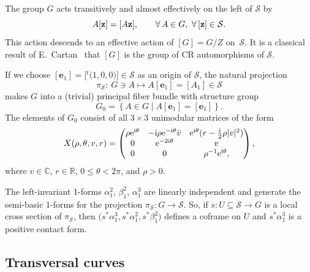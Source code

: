 \documentclass[pdftex]{sigma}
\numberwithin{equation}{section}
\def\C{\mathbb{C}}
\def\R{\mathbb{R}}
\def\S{\mathcal{S}}
\def\S{\mathcal{S}}
\begin{document}
The group $G$ acts transitively and almost effectively on the left of
$\S$ by
\begin{equation*}
 A[{\bf z}] = [A {\bf z}], \qquad \forall \, A\in {G}, \  \forall \, [{\bf z}] \in\S.
 \end{equation*}
This action descends to an effective action of $[{G}]={ G}/{Z}$ on~$\S$.
It is a classical result of E.~Cartan~\cite{Cartan1932-2,Cartan1932,ChMo1974} that $[{G}]$
is the group of CR automorphisms
of $\S$.

If we choose $[\mathbf{e}_1]=\big[ {^t\!(}1,0,0)\big]\in \mathcal{S}$ as an origin of $\mathcal{S}$,
the natural projection
\begin{equation*}
 \pi_\S\colon \ {G}\ni A \mapsto A[\mathbf{e}_1] =[A_1]\in\S
 \end{equation*}
makes ${G}$ into a (trivial) principal fiber bundle with structure group
\begin{equation*}
 {G}_0=\left\{ A\in {G} \mid A[\mathbf{e}_1]=[\mathbf{e}_1] \right\}.
 \end{equation*}
The elements of ${G}_0$ consist of all $3\times3$ unimodular matrices of the form
\begin{equation}\label{gauge}
{X}(\rho,\theta,v,r)=
\begin{pmatrix}
\rho {\rm e}^{{\rm i}\theta} & -{\rm i}\rho {\rm e}^{-{\rm i}\theta}\bar {v} & {\rm e}^{{\rm i}\theta}(r-\frac{{\rm i}}{2}\rho |v|^2) \\
 0 & {\rm e}^{-2{\rm i}\theta} & v \\
 0 & 0 & \rho^{-1}{\rm e}^{{\rm i}\theta}, \\
 \end{pmatrix},
 \end{equation}
where $v\in \C$, $r \in \R$, $0\leq\theta <2\pi$, and $\rho>0$.

\begin{Remark}
The left-invariant 1-forms $\alpha_1^2$, $\beta_1^2$, $\alpha_1^3$ are linearly independent and generate
the semi-basic 1-forms for the projection $\pi_{\mathcal S}\colon G \to \mathcal S$. So, if $s\colon U\subseteq\S\to{G}$ is
a local cross section of $\pi_\S$,
then $\big(s^*\alpha_1^3 , s^*\alpha_1^2, s^* \beta_1^2 \big)$
defines a coframe on $U$ and $s^*\alpha_1^3 $ is a positive contact form.\end{Remark}

\subsection{Transversal curves}
\end{document}
